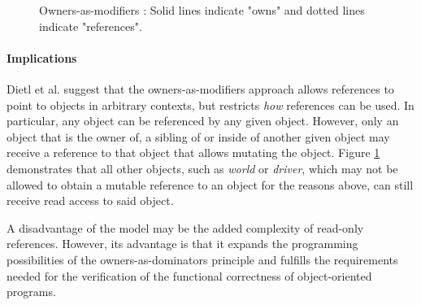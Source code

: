 \documentclass[sigplan,11pt,nonacm]{acmart}
\begin{document}
\begin{figure}

  \caption{Owners-as-modifiers \cite{ownership-types-survey}: Solid lines indicate "owns" and dotted lines indicate "references".}
  \label{fig:owners-as-modifiers}
\end{figure}

\paragraph{Implications}

Dietl et al. \cite{lightweight-ownership} suggest that the owners-as-modifiers approach allows references to point to objects in arbitrary contexts, but restricts \emph{how} references can be used.
In particular, any object can be referenced by any given object.
However, only an object that is the owner of, a sibling of or inside of another given object may receive a reference to that object that allows mutating the object.
Figure \ref{fig:owners-as-modifiers} demonstrates that all other objects, such as \emph{world} or \emph{driver}, which may not be allowed to obtain a mutable reference to an object for the reasons above, can still receive read access to said object.

A disadvantage of the model may be the added complexity of read-only references.
However, its advantage is that it expands the programming possibilities of the owners-as-dominators principle and fulfills the requirements needed for the verification of the functional correctness of object-oriented programs.
\end{document}
